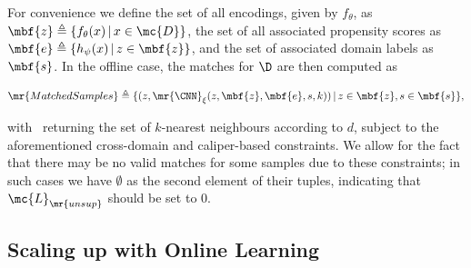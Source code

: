 For convenience we define the set of all encodings, given by $f_\theta$, as $\mbf{z} \triangleq \{
f_\theta (x)\, |\, x \in \mc{D} \}$, the set of all associated propensity scores as $\mbf{e}
\triangleq \{ h_\psi (x) \, | \, z \in \mbf{z} \}$, and the set of associated domain labels as
$\mbf{s}$.
%
In the offline case, the matches for $\D$ are then computed as

\begin{equation}
    \mr{MatchedSamples} \triangleq \{ (z,  \mr{\CNN}_\xi(z, \mbf{z}, \mbf{e}, s, k)) \, | \, z \in
    \mbf{z}, s \in \mbf{s} \},
\end{equation}

with \CNN \ returning the set of $k$-nearest neighbours according to $d$, subject to the
aforementioned cross-domain and caliper-based constraints. We allow for the fact that there may be
no valid matches for some samples due to these constraints; in such cases we have $\emptyset$ as
the second element of their tuples, indicating that $\mc{L}_{\mr{unsup}}$ should be set to $0$.
%


\subsection{Scaling up with Online Learning}\label{subsec:ol}


